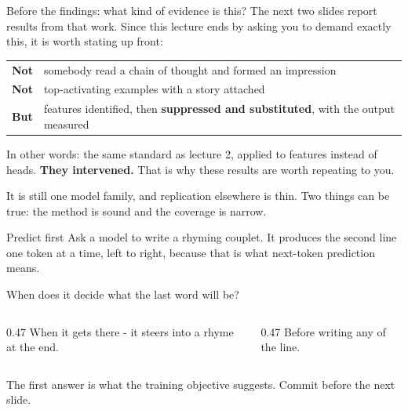 \documentclass[aspectratio=169]{beamer}
\newcommand{\takebox}[1]{%
  \begin{tcolorbox}[colback=paramgreen!8, colframe=paramgreen, boxrule=0.6pt, arc=2pt]
  #1
  \end{tcolorbox}}
\begin{document}
\begin{frame}{Before the findings: what kind of evidence is this?}
  \vspace{0.8em}
  The next two slides report results from that work. Since this lecture ends by asking you to
  demand exactly this, it is worth stating up front:

  \vspace{0.9em}
  \begin{center}
  \small
  \begin{tabular}{@{}ll@{}}
    \toprule
    \textbf{Not} & somebody read a chain of thought and formed an impression\\[0.4em]
    \textbf{Not} & top-activating examples with a story attached\\[0.4em]
    \textbf{But} & features identified, then \textbf{suppressed and substituted}, with the
      output measured\\
    \bottomrule
  \end{tabular}
  \end{center}

  \vspace{1.0em}
  \takebox{In other words: the same standard as lecture 2, applied to features instead of heads.
  \textbf{They intervened.} That is why these results are worth repeating to you.}

  \vspace{0.6em}
  {\footnotesize It is still one model family, and replication elsewhere is thin. Two things can
  be true: the method is sound and the coverage is narrow.}
\end{frame}

\begin{frame}{Predict first}
  \vspace{1.0em}
  Ask a model to write a rhyming couplet. It produces the second line one token at a time, left
  to right, because that is what next-token prediction means.

  \vspace{1.3em}
  \begin{center}
    {\large When does it decide what the last word will be?}
  \end{center}

  \vspace{1.3em}
  \begin{columns}[T]
    \begin{column}{0.47\textwidth}
      \centering When it gets there - it steers into a rhyme at the end.
    \end{column}
    \begin{column}{0.47\textwidth}
      \centering Before writing any of the line.
    \end{column}
  \end{columns}

  \vspace{1.2em}
  \begin{center}
    {\footnotesize The first answer is what the training objective suggests. Commit before the
    next slide.}
  \end{center}
\end{frame}
\end{document}
